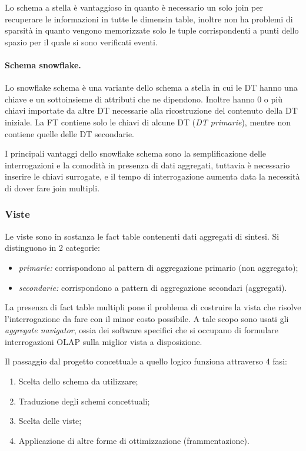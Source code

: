 \documentclass[a4paper, 10pt]{article}
\begin{document}
	Lo schema a stella è vantaggioso in quanto è necessario un solo join per recuperare le informazioni in tutte le dimensin table, inoltre non ha problemi di sparsità in quanto vengono memorizzate solo le tuple corrispondenti a punti dello spazio per il quale si sono verificati eventi.
	
	\paragraph{Schema snowflake.} Lo snowflake schema è una variante dello schema a stella in cui le DT hanno una chiave e un sottoinsieme di attributi che ne dipendono. Inoltre hanno 0 o più chiavi importate da altre DT necessarie alla ricostruzione del contenuto della DT iniziale. La FT contiene solo le chiavi di alcune DT (\textit{DT primarie}), mentre non contiene quelle delle DT secondarie.
	
	I principali vantaggi dello snowflake schema sono la semplificazione delle interrogazioni e la comodità in presenza di dati aggregati, tuttavia è necessario inserire le chiavi surrogate, e il tempo di interrogazione aumenta data la necessità di dover fare join multipli.
	
	\subsubsection{Viste}
	Le viste sono in sostanza le fact table contenenti dati aggregati di sintesi. Si distinguono in 2 categorie: \begin{itemize}
		\item \textit{primarie:} corrispondono al pattern di aggregazione primario (non aggregato);
		\item \textit{secondarie:} corrispondono a pattern di aggregazione secondari (aggregati).
	\end{itemize}

	La presenza di fact table multipli pone il problema di costruire la vista che risolve l'interrogazione da fare con il minor costo possibile. A tale scopo sono usati gli \textit{aggregate navigator}, ossia dei software specifici che si occupano di formulare interrogazioni OLAP sulla miglior vista a disposizione.
	
	Il passaggio dal progetto concettuale a quello logico funziona attraverso 4 fasi:\begin{enumerate}
		\item Scelta dello schema da utilizzare;
		\item Traduzione degli schemi concettuali;
		\item Scelta delle viste;
		\item Applicazione di altre forme di ottimizzazione (frammentazione).
	\end{enumerate}
\end{document}
